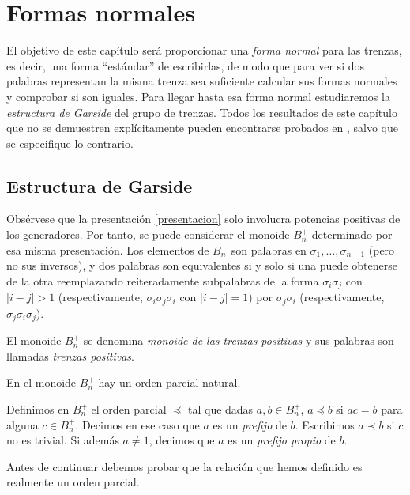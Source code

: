 \documentclass[TFG.tex]{subfiles}
\begin{document}
\chapter{Formas normales}

El objetivo de este capítulo será proporcionar una \emph{forma normal} para las trenzas, es decir, una forma ``estándar'' de escribirlas, de modo que para ver si dos palabras representan la misma trenza sea suficiente calcular sus formas normales y comprobar si son iguales. Para llegar hasta esa forma normal estudiaremos la \emph{estructura de Garside} del grupo de trenzas. Todos los resultados de este capítulo que no se demuestren explícitamente pueden encontrarse probados en \cite{Garside}, salvo que se especifique lo contrario.

\section{Estructura de Garside}



Obsérvese que la presentación \ref{presentacion} solo involucra potencias positivas de los generadores. Por tanto, se puede considerar el monoide $B_n^+$ determinado por esa misma presentación. Los elementos de $B_n^+$ son palabras en $\sigma_1,\dots,\sigma_{n-1}$ (pero no sus inversos), y dos palabras son equivalentes si y solo si una puede obtenerse de la otra reemplazando reiteradamente subpalabras de la forma $\sigma_i\sigma_j$ con $|i-j|>1$ (respectivamente, $\sigma_i\sigma_j\sigma_i$ con $|i-j|=1$) por $\sigma_j\sigma_i$ (respectivamente, $\sigma_j\sigma_i\sigma_j$).

\begin{defi}
El monoide $B_n^+$ se denomina \emph{monoide de las trenzas positivas} y sus palabras son llamadas \emph{trenzas positivas}.
\end{defi}
En el monoide $B_n^+$ hay un orden parcial natural. 
\begin{defi}
Definimos en $B_n^+$ el orden parcial $\preccurlyeq$ tal que dadas $a,b\in B_n^+$, $a\preccurlyeq b$ si $ac=b$ para alguna $c\in B_n^+$. Decimos en ese caso que $a$ es un \emph{prefijo} de $b$. Escribimos $a\prec b$ si $c$ no es trivial. Si además $a\neq 1$, decimos que $a$ es un \emph{prefijo propio} de $b$. 
\end{defi}

Antes de continuar debemos probar que la relación que hemos definido es realmente un orden parcial.
\end{document}
